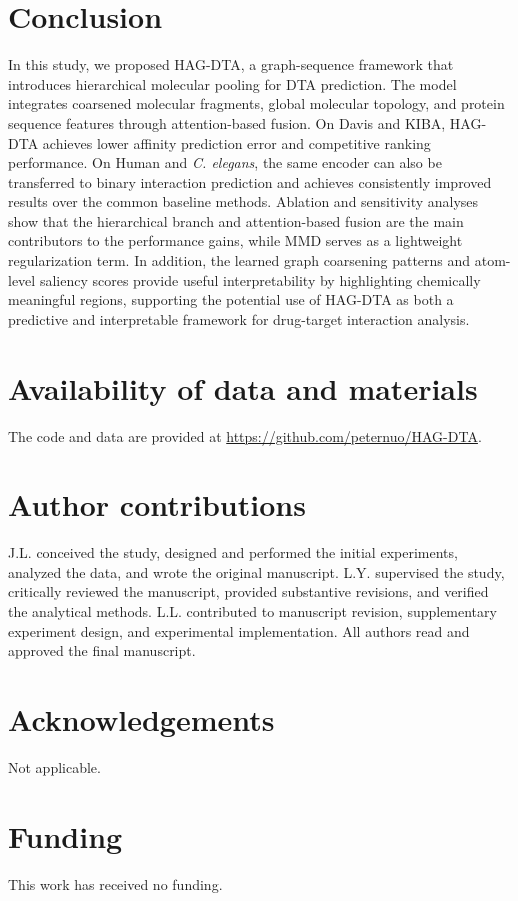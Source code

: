 \documentclass[pdflatex,sn-mathphys-num]{sn-jnl}%
\theoremstyle{thmstyleone}%
\theoremstyle{thmstyletwo}%
\theoremstyle{thmstylethree}%
\begin{document}
\section{Conclusion}

In this study, we proposed HAG-DTA, a graph-sequence framework that introduces hierarchical molecular pooling for DTA prediction. The model integrates coarsened molecular fragments, global molecular topology, and protein sequence features through attention-based fusion. On Davis and KIBA, HAG-DTA achieves lower affinity prediction error and competitive ranking performance. On Human and \textit{C. elegans}, the same encoder can also be transferred to binary interaction prediction and achieves consistently improved results over the common baseline methods. Ablation and sensitivity analyses show that the hierarchical branch and attention-based fusion are the main contributors to the performance gains, while MMD serves as a lightweight regularization term. In addition, the learned graph coarsening patterns and atom-level saliency scores provide useful interpretability by highlighting chemically meaningful regions, supporting the potential use of HAG-DTA as both a predictive and interpretable framework for drug-target interaction analysis.


\section*{Availability of data and materials}
The code and data are provided at \href{https://github.com/peternuo/HAG-DTA}{https://github.com/peternuo/HAG-DTA}.

\section*{Author contributions}
J.L. conceived the study, designed and performed the initial experiments, analyzed the data, and wrote the original manuscript. L.Y. supervised the study, critically reviewed the manuscript, provided substantive revisions, and verified the analytical methods. L.L. contributed to manuscript revision, supplementary experiment design, and experimental implementation. All authors read and approved the final manuscript.

\section*{Acknowledgements}
Not applicable.

\section*{Funding}
This work has received no funding.
\end{document}
